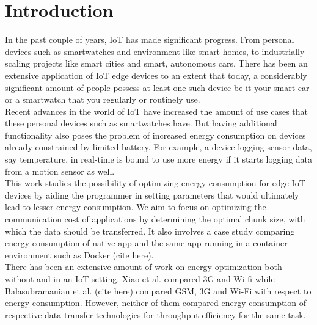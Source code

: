 
\chapter{Introduction}\label{ch:chapter1}

In the past couple of years, IoT has made significant progress. From personal devices 
such as smartwatches and environment like smart homes, to industrially scaling projects 
like smart cities and smart, autonomous cars. There has been an extensive application of 
IoT edge devices to an extent that today, a considerably significant amount of people possess 
at least one such device \textemdash be it your smart car or a smartwatch that you regularly 
or routinely use. \\
Recent advances in the world of IoT have increased the amount of use cases that these 
personal devices such as smartwatches have. But having additional functionality also poses 
the problem of increased energy consumption on devices already constrained by limited battery. 
For example, a device logging sensor data, say temperature, in real-time is bound to use 
more energy if it starts logging data from a motion sensor as well. \\
This work studies the possibility of optimizing energy consumption for edge IoT devices 
by aiding the programmer in setting parameters that would ultimately lead to lesser energy 
consumption. We aim to focus on optimizing the communication cost of applications by determining 
the optimal chunk size, with which the data should be transferred. It also involves a case study 
comparing energy consumption of native app and the same app running in a container environment 
such as Docker (cite here). \\
There has been an extensive amount of work on energy optimization \textemdash both without 
and in an IoT setting. Xiao et al. \cite{4756414} compared 3G and Wi-fi while Balasubramanian 
et al. (cite here) compared GSM, 3G and Wi-Fi with respect to energy consumption. However, 
neither of them compared energy consumption of respective data transfer technologies 
for throughput efficiency for the same task. \\